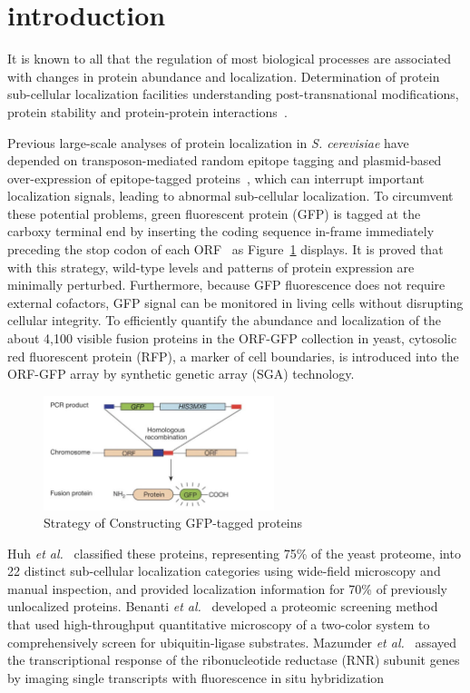 \documentclass[12pt]{article}
\begin{document}
\section*{introduction}
\par It is known to all that the regulation of most biological processes are associated with changes in protein abundance and localization. Determination of protein sub-cellular localization facilities understanding post-transnational modifications, protein stability and protein-protein interactions~\cite{chong2015yeast}.
\par Previous large-scale analyses of protein localization in \textit{S. cerevisiae} have depended on transposon-mediated random epitope tagging and plasmid-based over-expression of epitope-tagged proteins~\cite{ross1999large}, which can interrupt important localization signals, leading to abnormal sub-cellular localization. To circumvent these potential problems, green fluorescent protein (GFP) is tagged at the carboxy terminal end by inserting the coding sequence in-frame immediately preceding the stop codon of each ORF~\cite{huh2003global} as Figure~\ref{fig:gfp} displays. It is proved that with this strategy, wild-type levels and patterns of protein expression are minimally perturbed. Furthermore, because GFP fluorescence does not require external cofactors, GFP signal can be monitored in living cells without disrupting cellular integrity. To efficiently quantify the abundance and localization of the about 4,100 visible fusion proteins in the ORF-GFP collection in yeast, cytosolic red fluorescent protein (RFP), a marker of cell boundaries, is introduced into the ORF-GFP array by synthetic genetic array (SGA) technology.
\begin{figure}[!htbp]
\centering
\includegraphics[width=0.6\textwidth]{1.png}
\caption{Strategy of Constructing GFP-tagged proteins}
\label{fig:gfp}
\end{figure}
\par Huh \textit{et al.}~\cite{huh2003global} classified these proteins, representing 75\% of the yeast proteome, into 22 distinct sub-cellular localization categories using wide-field microscopy and manual inspection, and provided localization information for 70\% of previously unlocalized proteins. Benanti \textit{et al.}~\cite{benanti2007proteomic} developed a proteomic screening method that used high-throughput quantitative microscopy of a two-color system to comprehensively screen for ubiquitin-ligase substrates.  Mazumder \textit{et al.}~\cite{mazumder2013single} assayed the transcriptional response of the ribonucleotide reductase (RNR) subunit genes by imaging single transcripts with fluorescence in situ hybridization
\end{document}
